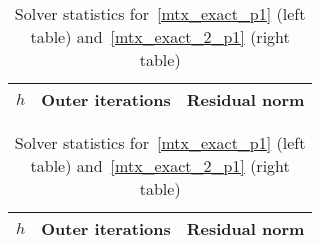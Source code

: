 \documentclass[12pt]{article}
\newcommand{\vect}[1]{\boldsymbol{\mathbf{#1}}}
\newcommand{\sphere}{{\Gamma_{\text{sph}}}}
\newcommand{\LTwoSpace}[1][\Gamma]{{\mathbb L^2\left({#1}\right)}}
\newcommand{\HOneSpace}[1][\Gamma]{{\mathbb H^1\left({#1}\right)}}
\begin{document}
\begin{table}[h!]
	\centering\small
	\caption{Solver statistics for~\eqref{mtx_exact_p1} (left table) and~\eqref{mtx_exact_2_p1} (right table)}
	\label{tab:p1p1_iters}
	\begin{subtable}{.5\linewidth}\centering
		\begin{tabular}[1.3]{|c|c|c|}
			\hline
			$h$ & Outer iterations & Residual norm \\
			\hline
			
		\end{tabular}
	\end{subtable}%
	\begin{subtable}{.5\linewidth}\centering
		\begin{tabular}[1.3]{|c|c|c|}
			\hline
			$h$ & Outer iterations & Residual norm \\
			\hline
			
		\end{tabular}
	\end{subtable}
\end{table}

%			
%			
\end{document}
